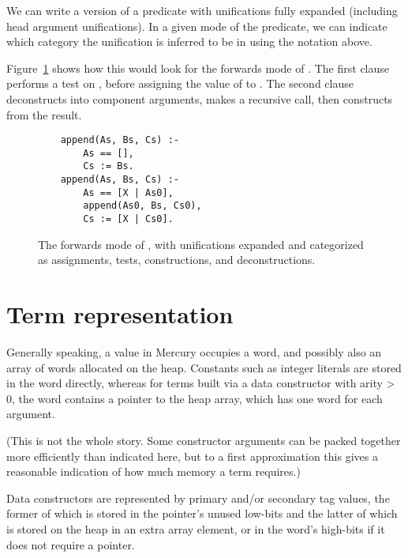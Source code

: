 We can write a version of a predicate
with unifications fully expanded
(including head argument unifications).
In a given mode of the predicate,
we can indicate which category
the unification is inferred to be in
using the notation above.

Figure~\ref{fig:forwards-append}
shows how this would look
for the forwards mode of .
The first clause performs a test on ,
before assigning the value of  to .
The second clause deconstructs 
into component arguments,
makes a recursive call,
then constructs  from the result.

\begin{figure}
\begin{verbatim}
    append(As, Bs, Cs) :-
        As == [],
        Cs := Bs.
    append(As, Bs, Cs) :-
        As == [X | As0],
        append(As0, Bs, Cs0),
        Cs := [X | Cs0].
\end{verbatim}
\caption{
The forwards mode of ,
with unifications expanded and categorized as
assignments, tests, constructions, and deconstructions.
\label{fig:forwards-append}
}
\end{figure}


\section{Term representation}
\label{sec:term-rep}

Generally speaking,
a value in Mercury occupies a word,
and possibly also an array of words allocated on the heap.
Constants such as integer literals
are stored in the word directly,
whereas for terms built via a data constructor with arity > 0,
the word contains a pointer to the heap array,
which has one word for each argument.

(This is not the whole story.
Some constructor arguments can be packed together
more efficiently than indicated here,
but to a first approximation
this gives a reasonable indication of
how much memory a term requires.)

Data constructors are represented by
primary and/or secondary tag values,
the former of which is stored in the pointer's unused low-bits
and the latter of which is stored on the heap
in an extra array element,
or in the word's high-bits if it does not require a pointer.

